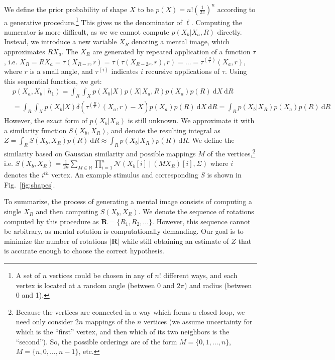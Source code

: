 \documentclass{article} %
\begin{document}
We define the prior probability of shape $X$ to be
$p(X)=n!\left(\frac{1}{2\pi}\right)^n$ according to a generative
procedure.\footnote{A set of $n$ vertices could be chosen in any of
  $n!$ different ways, and each vertex is located at a random angle
  (between 0 and $2\pi$) and radius (between 0 and 1).} This gives us
the denominator of $\ell$. Computing the numerator is more difficult,
as we we cannot compute $p(X_b\vert X_a, R)$ directly. Instead, we
introduce a new variable $X_R$ denoting a mental image, which
approximates $RX_a$. The $X_R$ are generated by repeated application
of a function $\tau$, i.e. $X_R=RX_a=\tau(X_{R-r},
r)=\tau(\tau(X_{R-2r}, r), r)=\ldots{}=\tau^{(\frac{R}{r})}(X_a, r)$,
where $r$ is a small angle, and $\tau^{(i)}$ indicates $i$ recursive
applications of $\tau$. Using this sequential function, we get:
\begin{align}
  &p(X_a, X_b\ \vert \ h_1)=\int_R \int_{X} p(X_b\vert X) p(X\vert X_a, R)p(X_a)p(R)\ \mathrm{d}X\ \mathrm{d}R \nonumber \\
  &= \int_R \int_X p(X_b\vert X)\delta(\tau^{(\frac{R}{r})}(X_a, r)-X)p(X_a)p(R)\ \mathrm{d}X\ \mathrm{d}R = \int_R p(X_b\vert X_R)p(X_a)p(R)\ \mathrm{d}R
\end{align}
However, the exact form of $p(X_b\vert X_R)$ is still unknown. We
approximate it with a similarity function $S(X_b, X_R)$, and denote
the resulting integral as $Z=\int_R S(X_b, X_R)p(R)\
\mathrm{d}R\approx \int_R p(X_b\vert X_R)p(R)\ \mathrm{d}R$.  We
define the similarity based on Gaussian similarity and possible
mappings $M$ of the vertices,\footnote{Because the vertices are
  connected in a way which forms a closed loop, we need only consider
  $2n$ mappings of the $n$ vertices (we assume uncertainty for which
  is the ``first'' vertex, and then which of its two neighbors is the
  ``second''). So, the possible orderings are of the form
  $M=\lbrace{}0, 1, \ldots{}, n\rbrace{}$, $M=\lbrace{}n, 0, \ldots{},
  n-1\rbrace{}$, etc.} i.e. $S(X_b,
X_R)=\frac{1}{2n}\sum_{M\in\mathbb{M}}\prod_{i=1}^n\mathcal{N}(X_b[i]\
\vert \ (MX_R)[i], \Sigma)$ where $i$ denotes the $i^{th}$ vertex. An
example stimulus and corresponding $S$ is shown in
Fig.~\ref{fig:shapes}.

To summarize, the process of generating a mental image consists of
computing a single $X_R$ and then computing $S(X_b, X_R)$. We denote
the sequence of rotations computed by this procedure as
$\mathbf{R}=\{R_1, R_2, \ldots{}\}$. However, this sequence cannot be
arbitrary, as mental rotation is computationally demanding. Our goal
is to minimize the number of rotations $\vert\mathbf{R}\vert$ while
still obtaining an estimate of $Z$ that is accurate enough to choose
the correct hypothesis.
\end{document}
